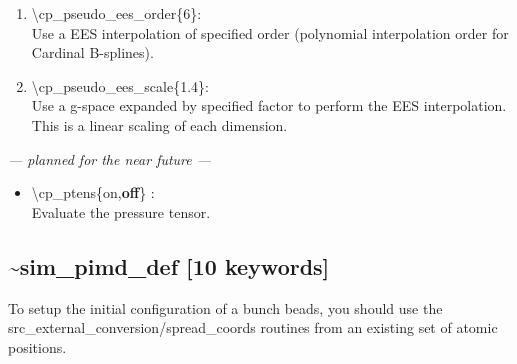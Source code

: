 \documentclass[12pt,titlepage]{article}
\begin{document}
\begin{enumerate}
 \vspace{0.15in} 
 \item  \textbackslash cp\_pseudo\_ees\_order\{6\}: \\     
     Use a EES interpolation of specified order (polynomial interpolation order for Cardinal B-splines).

 \vspace{0.15in} 
 \item  \textbackslash cp\_pseudo\_ees\_scale\{1.4\}: \\     
     Use a g-space expanded by specified factor to perform the EES interpolation.  This is a linear scaling of each dimension.
\end{enumerate}

 \vspace{0.15in} 
{\it
--- planned for the near future ---
\vspace{0.15in} 
\begin{itemize}
 \item  \textbackslash cp\_ptens\{on,{\bf off}\} : \\
      Evaluate the pressure tensor. 
      \end{itemize}
}

\newpage
\subsection*{\bf \~{}sim\_pimd\_def [10 keywords]}

To setup the initial configuration of a bunch beads, you should use the\\
 src\_external\_conversion/spread\_coords routines from an existing set of atomic positions.
\end{document}
